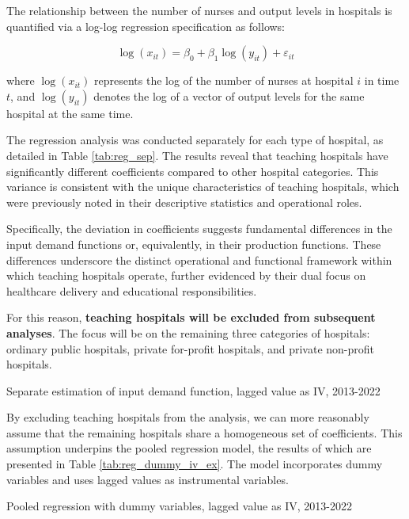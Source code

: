 \documentclass[12pt]{article}
\begin{document}
The relationship between the number of nurses and output levels in hospitals is
quantified via a log-log regression specification as follows:

\begin{equation}
    \log(x_{it}) = \beta_0 + \beta_1 \log(y_{it}) + \varepsilon_{it}
\end{equation}

where $\log(x_{it})$ represents the log of the number of nurses at hospital $i$
in time $t$, and $\log(y_{it})$ denotes the log of a vector of output levels
for the same hospital at the same time.

The regression analysis was conducted separately for each type of hospital, as
detailed in Table \ref{tab:reg_sep}. The results reveal that teaching hospitals
have significantly different coefficients compared to other hospital
categories. This variance is consistent with the unique characteristics of
teaching hospitals, which were previously noted in their descriptive statistics
and operational roles.

Specifically, the deviation in coefficients suggests fundamental differences in
the input demand functions or, equivalently, in their production functions.
These differences underscore the distinct operational and functional framework
within which teaching hospitals operate, further evidenced by their dual focus
on healthcare delivery and educational responsibilities.

For this reason, \textbf{teaching hospitals will be excluded from subsequent
    analyses}. The focus will be on the remaining three categories of hospitals:
ordinary public hospitals, private for-profit hospitals, and private non-profit
hospitals.

\begin{table}[h!]
    \centering
    
    \caption{Separate estimation of input demand function, lagged value as IV, 2013-2022}
    \label{tab:reg_sep}
\end{table}

By excluding teaching hospitals from the analysis, we can more reasonably
assume that the remaining hospitals share a homogeneous set of coefficients.
This assumption underpins the pooled regression model, the results of which are
presented in Table \ref{tab:reg_dummy_iv_ex}. The model incorporates dummy
variables and uses lagged values as instrumental variables.

\begin{table}[h!]
    \centering
    
    \caption{Pooled regression with dummy variables, lagged value as IV, 2013-2022}
    \label{tab:reg_dummy_iv_ex}
\end{table}
\end{document}
